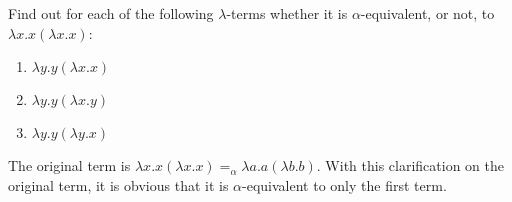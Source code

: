 \begin{problem}{1.2}
    Find out for each of the following $\lambda$-terms whether it is $\alpha$-equivalent, or not, to $\lambda x.x(\lambda x.x)$:
    \begin{enumerate}[label=$(\alph*)$]
        \item $\lambda y.y(\lambda x.x)$
        \item $\lambda y.y(\lambda x.y)$
        \item $\lambda y.y(\lambda y.x)$
    \end{enumerate}
\end{problem}

\begin{solution}
    The original term is $\lambda x.x (\lambda x.x) =_\alpha \lambda a.a (\lambda b.b)$.
    With this clarification on the original term, it is obvious that it is $\alpha$-equivalent to only the first term.
\end{solution}